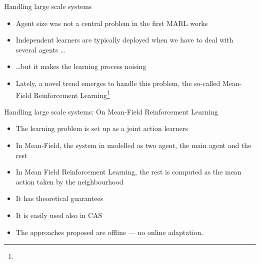 \documentclass[presentation]{beamer}\mode<presentation>{\usetheme{AMSBolognaFC}}
\begin{document}
\begin{frame}{Handling large scale systems}
	\begin{exampleblock}{}
		\begin{itemize}
			\item Agent size was not a central problem in the first MARL works
			\item Independent learners are typically deployed when we have to deal with several agents \dots
			\item \dots but it makes the learning process noising
			\item Lately, a novel trend emerges to handle this problem, the so-called Mean-Field Reinforcement Learning\footnote[frame]{}
		\end{itemize}
	\end{exampleblock}
\end{frame}

\begin{frame}{Handling large scale systems: On Mean-Field Reinforcement Learning}
	\begin{exampleblock}{}
		\begin{itemize}
			\item The learning problem is set up as a joint action learners
			\item In Mean-Field, the system in modelled as two agent, the main agent and the rest 
			\item In Mean Field Reinforcement Learning, the rest is computed as the mean action taken by the neighbourhood
			\item[{\color{teal}\faThumbsUp}] It has theoretical guarantees
			\item[{\color{teal}\faThumbsUp}] It is easily used also in CAS
			\item[{{\color{red}\faThumbsDown}}] The approaches proposed are offline --- no online adaptation.
		\end{itemize}
	\end{exampleblock}
\end{frame}
\end{document}
